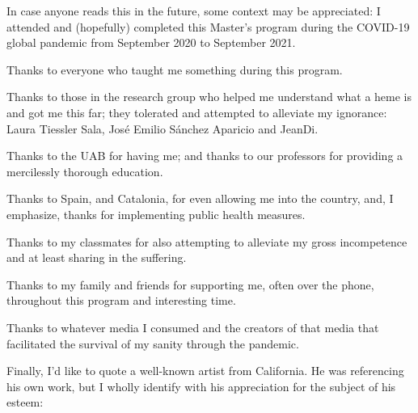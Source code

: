 \documentclass[a4paper, nobind]{templates/ociamthesis}
\begin{document}

\begin{romanpages}

\maketitle


\begin{acknowledgements}
 	In case anyone reads this in the future, some context may be appreciated: I attended and (hopefully) completed this Master's program during the COVID-19 global pandemic from September 2020 to September 2021.

  Thanks to everyone who taught me something during this program.

  Thanks to those in the research group who helped me understand what a heme is and got me this far; they tolerated and attempted to alleviate my ignorance: Laura Tiessler Sala, José Emilio Sánchez Aparicio and JeanDi.

  Thanks to the UAB for having me; and thanks to our professors for providing a mercilessly thorough education.

  Thanks to Spain, and Catalonia, for even allowing me into the country, and, I emphasize, thanks for implementing public health measures.

  Thanks to my classmates for also attempting to alleviate my gross incompetence and at least sharing in the suffering.

  Thanks to my family and friends for supporting me, often over the phone, throughout this program and interesting time.

  Thanks to whatever media I consumed and the creators of that media that facilitated the survival of my sanity through the pandemic.

  Finally, I'd like to quote a well-known artist from California. He was referencing his own work, but I wholly identify with his appreciation for the subject of his esteem:


\end{acknowledgements}
\end{romanpages}
\end{document}
